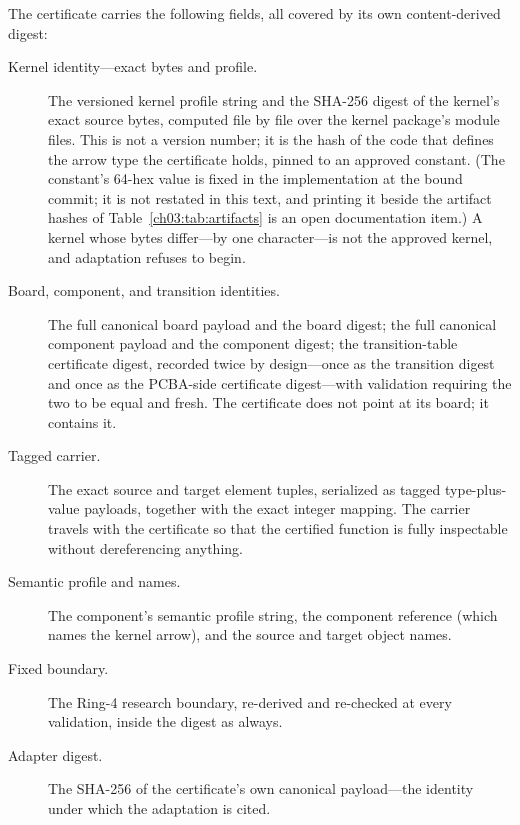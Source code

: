 \begin{definition}\label{ch09:def:certificate}
The certificate carries the following fields, all covered by its own content-derived digest:
\begin{description}
\item[Kernel identity---exact bytes and profile.] The versioned kernel profile string and the SHA-256 digest of the kernel's exact source bytes, computed file by file over the kernel package's module files. This is not a version number; it is the hash of the code that defines the arrow type the certificate holds, pinned to an approved constant. (The constant's 64-hex value is fixed in the implementation at the bound commit; it is not restated in this text, and printing it beside the artifact hashes of Table~\ref{ch03:tab:artifacts} is an open documentation item.) A kernel whose bytes differ---by one character---is not the approved kernel, and adaptation refuses to begin.
\item[Board, component, and transition identities.] The full canonical board payload and the board digest; the full canonical component payload and the component digest; the transition-table certificate digest, recorded twice by design---once as the transition digest and once as the PCBA-side certificate digest---with validation requiring the two to be equal and fresh. The certificate does not point at its board; it contains it.
\item[Tagged carrier.] The exact source and target element tuples, serialized as tagged type-plus-value payloads, together with the exact integer mapping. The carrier travels with the certificate so that the certified function is fully inspectable without dereferencing anything.
\item[Semantic profile and names.] The component's semantic profile string, the component reference (which names the kernel arrow), and the source and target object names.
\item[Fixed boundary.] The Ring-4 research boundary, re-derived and re-checked at every validation, inside the digest as always.
\item[Adapter digest.] The SHA-256 of the certificate's own canonical payload---the identity under which the adaptation is cited.
\end{description}
\end{definition}

